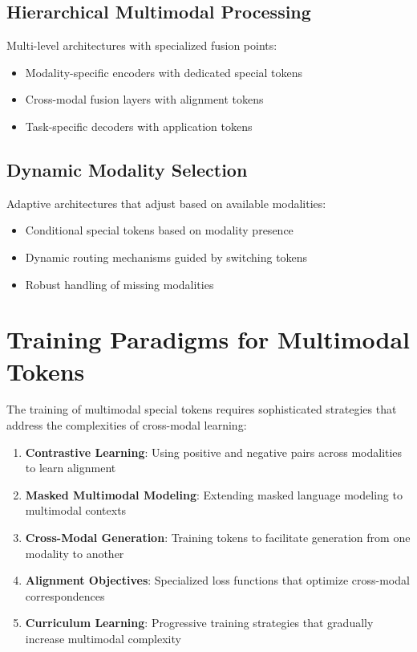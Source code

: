 \subsection{Hierarchical Multimodal Processing}
Multi-level architectures with specialized fusion points:
\begin{itemize}
\item Modality-specific encoders with dedicated special tokens
\item Cross-modal fusion layers with alignment tokens
\item Task-specific decoders with application tokens
\end{itemize}

\subsection{Dynamic Modality Selection}
Adaptive architectures that adjust based on available modalities:
\begin{itemize}
\item Conditional special tokens based on modality presence
\item Dynamic routing mechanisms guided by switching tokens
\item Robust handling of missing modalities
\end{itemize}

\section{Training Paradigms for Multimodal Tokens}

The training of multimodal special tokens requires sophisticated strategies that address the complexities of cross-modal learning:

\begin{enumerate}
\item \textbf{Contrastive Learning}: Using positive and negative pairs across modalities to learn alignment
\item \textbf{Masked Multimodal Modeling}: Extending masked language modeling to multimodal contexts
\item \textbf{Cross-Modal Generation}: Training tokens to facilitate generation from one modality to another
\item \textbf{Alignment Objectives}: Specialized loss functions that optimize cross-modal correspondences
\item \textbf{Curriculum Learning}: Progressive training strategies that gradually increase multimodal complexity
\end{enumerate}

